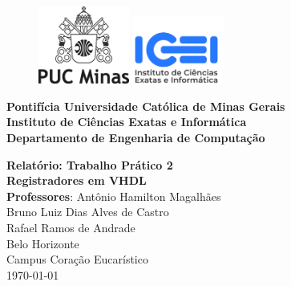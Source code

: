 \thispagestyle{empty} %

\begin{figure}[t]
    \includegraphics[width=3cm]{images/logo-puc-minas.png}
    \hspace{0.02\textwidth}
    \vline%
    \hspace{0.04\textwidth}
    \includegraphics[width=3cm]{images/logo-icei.jpeg}
\end{figure}

\hrulefill%
\vspace{\baselineskip}

\Large\noindent
\textbf{Pontifícia Universidade Católica de Minas Gerais} \\
\textbf{Instituto de Ciências Exatas e Informática} \\
\textbf{Departamento de Engenharia de Computação}

\begin{center}
    \vfill
    \Huge\textbf{Relatório: Trabalho Prático 2} \\
    \vspace{0.5cm}
    \Large\textbf{Registradores em VHDL} \\
    \vspace{1cm}
    \large \textbf{Professores}: Antônio Hamilton Magalhães\\
    \vspace{0.5cm}
    \large Bruno Luiz Dias Alves de Castro \\
    \large Rafael Ramos de Andrade \\
    \vfill
    \large Belo Horizonte \\ Campus Coração Eucarístico \\
    \vspace{\baselineskip}
    \large \today
\end{center}